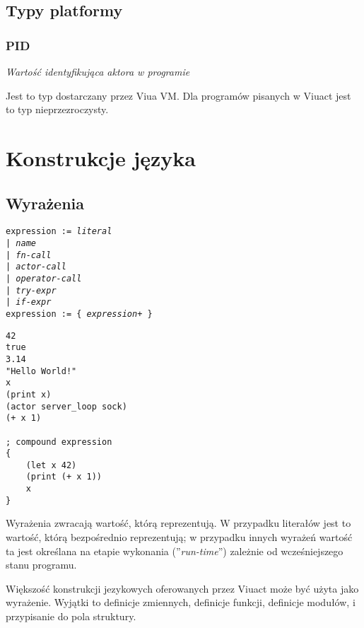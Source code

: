 \subsection{Typy platformy}

\subsubsection{PID}

\emph{Wartość identyfikująca aktora w programie}

Jest to typ dostarczany przez Viua VM. Dla programów pisanych w Viuact jest to
typ nieprzezroczysty.

\newpage

\section{Konstrukcje języka}

\subsection{Wyrażenia}
\label{language_expressions}

\texttt{expression := \emph{literal} \\
\phantom{expression :}| \emph{name} \\
\phantom{expression :}| \emph{fn-call} \\
\phantom{expression :}| \emph{actor-call} \\
\phantom{expression :}| \emph{operator-call} \\
\phantom{expression :}| \emph{try-expr} \\
\phantom{expression :}| \emph{if-expr}}
\\
\texttt{expression := \{ \emph{expression}+ \}}

\begin{lstlisting}
42
true
3.14
"Hello World!"
x
(print x)
(actor server_loop sock)
(+ x 1)

; compound expression
{
    (let x 42)
    (print (+ x 1))
    x
}
\end{lstlisting}

Wyrażenia zwracają wartość, którą reprezentują. W przypadku literałów jest to wartość, którą bezpośrednio
reprezentują; w przypadku innych wyrażeń wartość ta jest określana na etapie wykonania (''\emph{run-time}'')
zależnie od wcześniejszego stanu programu.

Większość konstrukcji jezykowych oferowanych przez Viuact może być użyta jako wyrażenie.
Wyjątki to definicje zmiennych, definicje funkcji, definicje modułów, i przypisanie do pola struktury.

